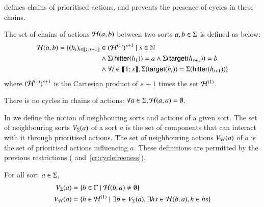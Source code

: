 defines chains of prioritised actions,
and  prevents the presence of cycles in these chains.
\begin{definition}
\label{def:chainsactions}
  The set of chains of actions $\mathcal{H}(a, b)$ between two sorts $a, b \in \Sigma$ is defined as below:
  \begin{align*}
  \mathcal{H}(a, b) = \{ (h_i)_{i \in \llbracket 1; s+1 \rrbracket} &\in (\mathcal{H}^{(1)})^{s+1} \mid s \in \mathbb{N} \\
    & \wedge \Sigma(\mathsf{hitter}(h_1)) = a \wedge \Sigma(\mathsf{target}(h_{s+1})) = b \\
    & \wedge \forall i \in \llbracket 1; s \rrbracket, \Sigma(\mathsf{target}(h_{i})) = \Sigma(\mathsf{hitter}(h_{i+1})) \}
  \end{align*}
  where $(\mathcal{H}^{(1)})^{s+1}$ is the Cartesian product of $s+1$ times the set $\mathcal{H}^{(1)}$.
\end{definition}
%
\begin{criterion}
\label{cr:cyclefreeness}
  There is no cycles in chains of actions:
  $\forall a \in \Sigma, \mathcal{H}(a, a) = \emptyset$.
\end{criterion}

In  we define the notion of neighbouring sorts and actions of a given sort.
The set of neighbouring sorts $V_\Sigma(a)$ of a sort $a$ is the set of components that can interact with it through prioritised actions.
The set of neighbouring actions $V_{\mathcal{H}}(a)$ of $a$ is the set of prioritised actions influencing $a$.
These definitions are permitted by the previous restrictions ( and~\ref{cr:cyclefreeness}).
\begin{definition}[$\Vs : \PHs \rightarrow \powerset(\PHsort)$; $\Vh : \PHs \rightarrow \powerset(\PHh)$]
\label{def:neighbours}
  For all sort $a \in \Sigma$,
  \begin{align*}
    V_\Sigma(a) &= \{ b \in \Gamma \mid \mathcal{H}(b, a) \neq \emptyset \}\\
    V_{\mathcal{H}}(a) &= \{ h \in \mathcal{H}^{(1)} \mid \exists b \in V_\Sigma(a), \exists hs \in \mathcal{H}(b,a), h \in hs \}
  \end{align*}
\end{definition}

